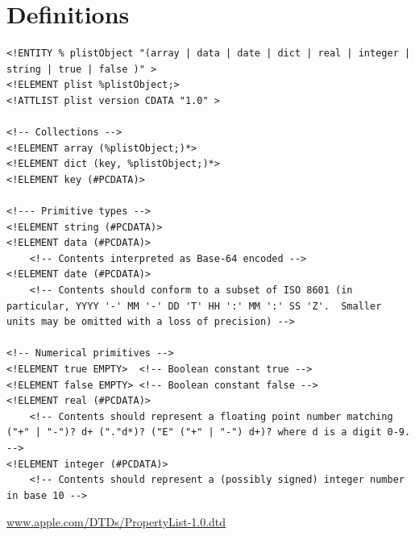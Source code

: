 
\chapter{Definitions}

\begin{table}[htdp]
\begin{center}
\begin{lstlisting}[mathescape]
<!ENTITY % plistObject "(array | data | date | dict | real | integer | string | true | false )" >
<!ELEMENT plist %plistObject;>
<!ATTLIST plist version CDATA "1.0" >

<!-- Collections -->
<!ELEMENT array (%plistObject;)*>
<!ELEMENT dict (key, %plistObject;)*>
<!ELEMENT key (#PCDATA)>

<!--- Primitive types -->
<!ELEMENT string (#PCDATA)>
<!ELEMENT data (#PCDATA)> 
    <!-- Contents interpreted as Base-64 encoded -->
<!ELEMENT date (#PCDATA)> 
    <!-- Contents should conform to a subset of ISO 8601 (in particular, YYYY '-' MM '-' DD 'T' HH ':' MM ':' SS 'Z'.  Smaller units may be omitted with a loss of precision) -->

<!-- Numerical primitives -->
<!ELEMENT true EMPTY>  <!-- Boolean constant true -->
<!ELEMENT false EMPTY> <!-- Boolean constant false -->
<!ELEMENT real (#PCDATA)> 
    <!-- Contents should represent a floating point number matching ("+" | "-")? d+ ("."d*)? ("E" ("+" | "-") d+)? where d is a digit 0-9.  -->
<!ELEMENT integer (#PCDATA)> 
    <!-- Contents should represent a (possibly signed) integer number in base 10 -->
\end{lstlisting}
\caption{\href{http://www.apple.com/DTDs/PropertyList-1.0.dtd}{www.apple.com/DTDs/PropertyList-1.0.dtd}}
\label{tab:PLISTDTD}
\end{center}

\end{table}%

